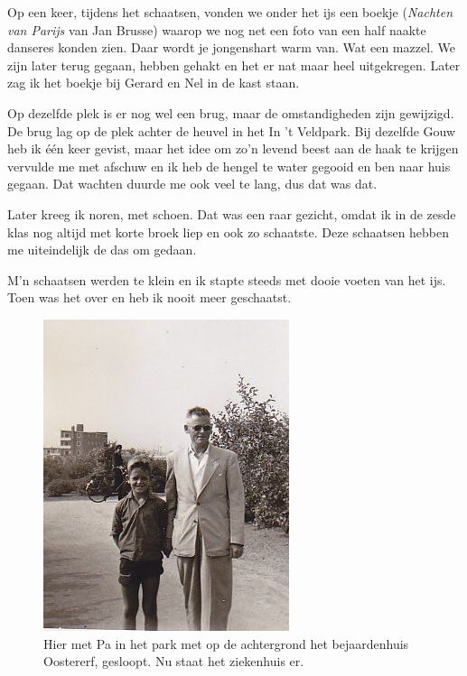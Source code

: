 \documentclass[10pt,twoside, openright]{memoir}
\begin{document}
Op een keer, tijdens het schaatsen, vonden we onder het ijs een boekje (\emph{Nachten van Parijs} van Jan Brusse) waarop we nog net een foto van een half naakte danseres konden zien. Daar wordt je jongenshart warm van. Wat een mazzel. We zijn later terug gegaan, hebben gehakt en het er nat maar heel uitgekregen. Later zag ik het boekje bij Gerard en Nel in de kast staan. 

Op dezelfde plek is er nog wel een brug, maar de omstandigheden zijn gewijzigd. De brug lag op de plek achter de heuvel in het In ’t Veldpark. Bij dezelfde Gouw heb ik één keer gevist, maar het idee om zo’n levend beest aan de haak te krijgen vervulde me met afschuw en ik heb de hengel te water gegooid en ben naar huis gegaan. Dat wachten duurde me ook veel te lang, dus dat was dat. 

Later kreeg ik noren, met schoen. Dat was een raar gezicht, omdat ik in de zesde klas nog altijd met korte broek liep en ook zo schaatste. Deze schaatsen hebben me uiteindelijk de das om gedaan. 

M’n schaatsen werden te klein en ik stapte steeds met dooie voeten van het ijs. Toen was het over en heb ik nooit meer geschaatst. 

\begin{figure}
\includegraphics[width=\textwidth]{img/ch13/metpa2}
\caption*{\footnotesize Hier met Pa in het park met op de achtergrond het bejaardenhuis Oostererf, gesloopt. Nu staat het ziekenhuis er.}
\end{figure}
\end{document}
